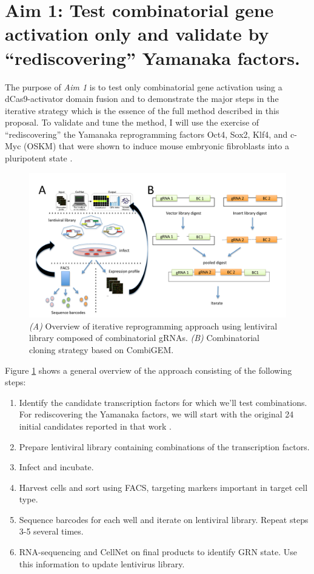 \documentclass[10pt]{article}
\begin{document}
\section{Aim 1: Test combinatorial gene activation only and validate by ``rediscovering'' Yamanaka factors.}

The purpose of \textit{Aim 1} is to test only combinatorial gene activation using a dCas9-activator domain fusion and to demonstrate the major steps in the iterative strategy which is the essence of the full method described in this proposal. To validate and tune the method, I will use the exercise of ``rediscovering'' the Yamanaka reprogramming factors Oct4, Sox2, Klf4, and c-Myc (OSKM) that were shown to induce mouse embryonic fibroblasts into a pluripotent state \cite{takahashi2006induction}.

\begin{figure}
\centering
\includegraphics[width=\textwidth]{fig1}
\caption{\textit{(A)} Overview of iterative reprogramming approach using lentiviral library composed of combinatorial gRNAs. \textit{(B)} Combinatorial cloning strategy based on CombiGEM\cite{cheng2014enhanced}.}
\label{fig1}
\end{figure}

Figure \ref{fig1} shows a general overview of the approach consisting of the following steps:
\begin{enumerate}
    \setlength{\itemsep}{0pt}
    \item{Identify the candidate transcription factors for which we'll test combinations. For rediscovering the Yamanaka factors, we will start with the original 24 initial candidates reported in that work \cite{takahashi2006induction}.}
    \item{Prepare lentiviral library containing combinations of the transcription factors.}
    \item{Infect and incubate.}
    \item{Harvest cells and sort using FACS, targeting markers important in target cell type.}
    \item{Sequence barcodes for each well and iterate on lentiviral library. Repeat steps 3-5 several times.}
    \item{RNA-sequencing and CellNet on final products to identify GRN state. Use this information to update lentivirus library.}
\end{enumerate}
\end{document}
